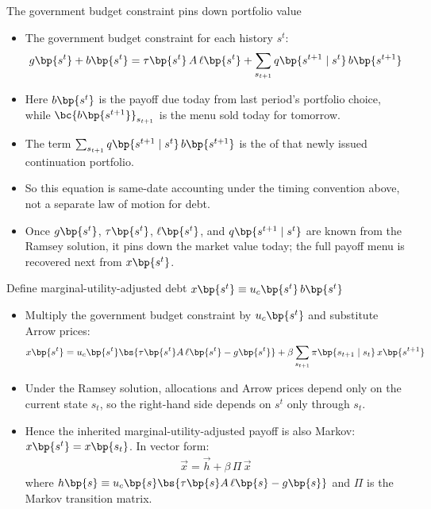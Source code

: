 \documentclass[11pt,xcolor={dvipsnames},aspectratio=159,hyperref={pdftex,pdfpagemode=UseNone,hidelinks,pdfdisplaydoctitle=true},usepdftitle=false]{beamer}
\begin{document}
            \begin{frame}{The government budget constraint pins down portfolio value}
                \begin{itemize}
                \item The government budget constraint for each history $s^t$:
                \begin{align*}
                    g\bp{s^t} + b\bp{s^t} = \tau\bp{s^t}\,A\,\ell\bp{s^t} + \sum_{s_{t+1}} q\bp{s^{t+1} \mid s^t}\, b\bp{s^{t+1}}
                \end{align*}
                \item Here $b\bp{s^t}$ is the payoff due today from last period's portfolio choice, while $\bc{b\bp{s^{t+1}}}_{s_{t+1}}$ is the menu sold today for tomorrow.
                \item The term $\sum_{s_{t+1}} q\bp{s^{t+1}\mid s^t}\, b\bp{s^{t+1}}$ is the  of that newly issued continuation portfolio.
                \item So this equation is same-date accounting under the timing convention above, not a separate law of motion for debt.
                \item Once $g\bp{s^t}$, $\tau\bp{s^t}$, $\ell\bp{s^t}$, and $q\bp{s^{t+1} \mid s^t}$ are known from the Ramsey solution, it pins down the market value today; the full payoff menu is recovered next from $x\bp{s^t}$.
                \end{itemize}
            \end{frame}

            \begin{frame}{Define marginal-utility-adjusted debt $x\bp{s^t} \equiv u_c\bp{s^t}\,b\bp{s^t}$}
                \begin{itemize}
                \item Multiply the government budget constraint by $u_c\bp{s^t}$ and substitute Arrow prices:
                \begin{align*}
                    x\bp{s^t} = u_c\bp{s^t}\bs{\tau\bp{s^t} A\,\ell\bp{s^t} - g\bp{s^t}} + \beta \sum_{s_{t+1}} \pi\bp{s_{t+1} \mid s_t}\, x\bp{s^{t+1}}
                \end{align*}
                \item Under the Ramsey solution, allocations and Arrow prices depend only on the current state $s_t$, so the right-hand side depends on $s^t$ only through $s_t$.
                \item Hence the inherited marginal-utility-adjusted payoff is also Markov: $x\bp{s^t}=x\bp{s_t}$. In vector form:
                \begin{align*}
                    \vec{x} = \vec{h} + \beta\, \Pi\, \vec{x}
                \end{align*}
                where $h\bp{s} \equiv u_c\bp{s}\bs{\tau\bp{s} A\,\ell\bp{s} - g\bp{s}}$ and $\Pi$ is the Markov transition matrix.
                \end{itemize}
            \end{frame}
\end{document}
